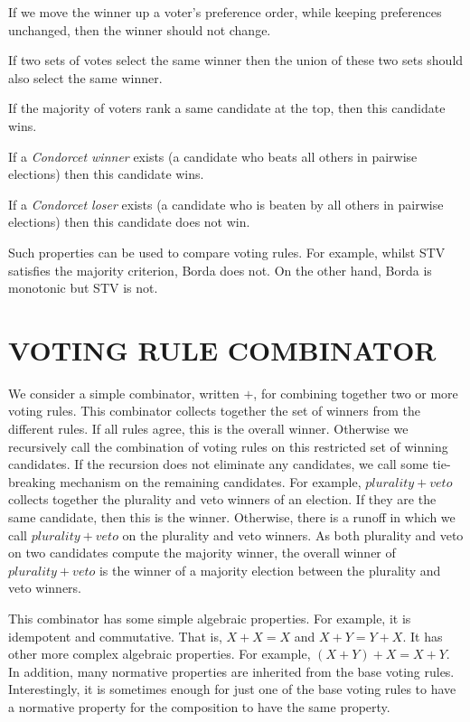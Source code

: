\documentclass{ecai2012}
\newcommand{\winner}[2]{\mbox{$#1 + #2$}}
\newcommand{\topk}{\mbox{$+$}}
\begin{document}
If we move the winner up a voter's preference
order, while keeping preferences unchanged,  then the winner should not change.

If two sets of votes select the same
winner then the union of these two
sets should also select the same winner.

If the majority of voters rank a same candidate at the top, then
this candidate wins.

If a {\em Condorcet winner} exists (a candidate
who beats all others in pairwise elections) then
this candidate wins.

If a {\em Condorcet loser} exists (a candidate
who is beaten by all others in pairwise elections) then
this candidate does not win.

Such properties can be used to compare voting
rules. For example, whilst
STV satisfies the majority criterion,
Borda does not. On the other hand,
Borda is monotonic but STV is not.

\section{VOTING RULE COMBINATOR}

We consider a simple combinator, written $\topk$, for
combining together two or more voting rules.
This combinator collects together the set of winners
from the different rules.
If all rules agree, this is the overall winner.
Otherwise we recursively
call the combination of voting
rules on this restricted set of winning candidates.
If the recursion
does not eliminate any candidates,
we call some tie-breaking mechanism on
the remaining candidates.
For example, $\winner{plurality}{veto}$
collects together the plurality and veto winners of
an election. If they are the same candidate, then
this is the winner. Otherwise, there is a runoff
in which we call
$\winner{plurality}{veto}$ on the plurality and veto winners.
As both plurality and veto on two candidates compute
the majority winner, the overall winner of
$\winner{plurality}{veto}$ is
the winner of a majority election between
the plurality and veto winners.

This combinator has some simple algebraic properties.
For example, it is idempotent and commutative.
That is, $\winner{X}{X}=X$ and
$\winner{X}{Y}=\winner{Y}{X}$.
It has %
other more complex algebraic
properties. For example,
$\winner{(\winner{X}{Y})}{X}=\winner{X}{Y}$.
In addition, many normative properties are inherited from the
base voting rules.
Interestingly,
it is sometimes enough for just one of the base
voting rules to have a normative property
for the composition to have the same property.
\end{document}
